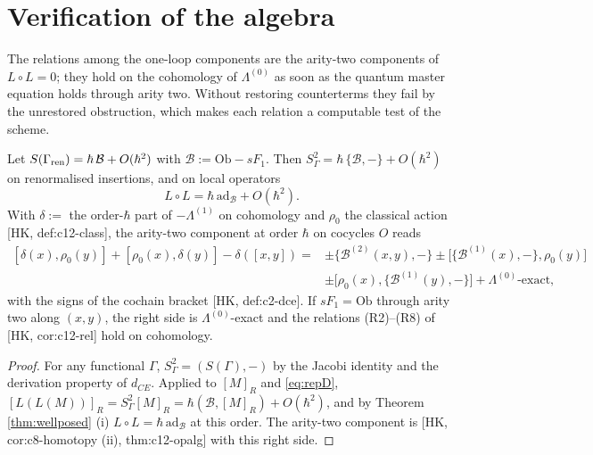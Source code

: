 
\section{Verification of the algebra}
\label{sec:alg}

The relations among the one-loop components are the arity-two components of $L\circ L=0$; they hold on the cohomology of $\Lambda^{(0)}$ as soon as the quantum master equation holds through arity two. Without restoring counterterms they fail by the unrestored obstruction, which makes each relation a computable test of the scheme.

\begin{theorem}
\label{thm:rel}
Let $S(\Gamma_{\rm ren})=\hbar\,\mathcal B+O(\hbar^2)$ with $\mathcal B:=\mathrm{Ob}-sF_1$. Then $S_\Gamma^2=\hbar\,\{\mathcal B,-\}+O(\hbar^2)$ on renormalised insertions, and on local operators
\[
L\circ L=\hbar\,\mathrm{ad}_{\mathcal B}+O(\hbar^2).
\]
With $\delta:=$ the order-$\hbar$ part of $-\Lambda^{(1)}$ on cohomology and $\rho_0$ the classical action [HK, def:c12-class], the arity-two component at order $\hbar$ on cocycles $O$ reads
\begin{equation}
\begin{aligned}
[\delta(x),\rho_0(y)]+[\rho_0(x),\delta(y)]-\delta([x,y])={}&\pm\{\mathcal B^{(2)}(x,y),-\}\pm\big[\{\mathcal B^{(1)}(x),-\},\rho_0(y)\big]\\
&\pm\big[\rho_0(x),\{\mathcal B^{(1)}(y),-\}\big]+\Lambda^{(0)}\text{-exact},
\end{aligned}
\label{eq:reldefect}
\end{equation}
with the signs of the cochain bracket [HK, def:c2-dce]. If $sF_1=\mathrm{Ob}$ through arity two along $(x,y)$, the right side is $\Lambda^{(0)}$-exact and the relations (R2)--(R8) of [HK, cor:c12-rel] hold on cohomology.
\end{theorem}

\begin{proof}
For any functional $\Gamma$, $S_\Gamma^2=(S(\Gamma),-)$ by the Jacobi identity and the derivation property of $d_{CE}$. Applied to $[M]_R$ and \eqref{eq:repD}, $[L(L(M))]_R=S_\Gamma^2[M]_R=\hbar(\mathcal B,[M]_R)+O(\hbar^2)$, and by Theorem \ref{thm:wellposed} (i) $L\circ L=\hbar\,\mathrm{ad}_{\mathcal B}$ at this order. The arity-two component is [HK, cor:c8-homotopy (ii), thm:c12-opalg] with this right side.
\end{proof}

